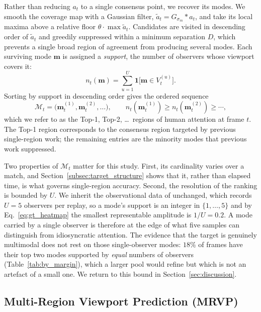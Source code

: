 \documentclass[preprint,12pt]{elsarticle}
\begin{document}
Rather than reducing $a_t$ to a single consensus point, we recover its modes.
We smooth the coverage map with a Gaussian filter, $\tilde{a}_t = G_{\sigma_m}
* a_t$, and take its local maxima above a relative floor
$\theta \cdot \max \tilde{a}_t$. Candidates are visited in descending order of
$\tilde{a}_t$ and greedily suppressed within a minimum separation $D$, which
prevents a single broad region of agreement from producing several modes. Each
surviving mode $\mathbf{m}$ is assigned a \emph{support}, the number of
observers whose viewport covers it:
\begin{equation}
  n_t(\mathbf{m}) = \sum_{u=1}^{U} \mathbf{1}\bigl[\mathbf{m} \in V^{(u)}_t\bigr].
  \label{eq:support}
\end{equation}
Sorting by support in descending order gives the ordered sequence
\begin{equation}
  \mathcal{M}_t = \bigl(\mathbf{m}^{(1)}_t, \mathbf{m}^{(2)}_t, \ldots\bigr),
  \qquad n_t(\mathbf{m}^{(1)}_t) \ge n_t(\mathbf{m}^{(2)}_t) \ge \cdots,
  \label{eq:ranked_modes}
\end{equation}
which we refer to as the Top-1, Top-2, \ldots\ regions of human attention at
frame $t$. The Top-1 region corresponds to the consensus region targeted by
previous single-region work; the remaining entries are the minority modes that
previous work suppressed.

Two properties of $\mathcal{M}_t$ matter for this study. First, its cardinality
varies over a match, and Section~\ref{subsec:target_structure} shows that it,
rather than elapsed time, is what governs single-region accuracy. Second, the
resolution of the ranking is bounded by $U$. We inherit the observational data
of \cite{joo2023learning} unchanged, which records $U=5$ observers per replay,
so a mode's support is an integer in $\{1,\ldots,5\}$ and by
Eq.~\ref{eq:gt_heatmap} the smallest representable amplitude is $1/U = 0.2$.
A mode carried by a single observer is therefore at the edge of what five
samples can distinguish from idiosyncratic attention. The evidence that the
target is genuinely multimodal does not rest on those single-observer modes:
$18\%$ of frames have their top two modes supported by \emph{equal} numbers of
observers (Table~\ref{tab:by_margin}), which a larger pool would refine but
which is not an artefact of a small one. We return to this bound in
Section~\ref{sec:discussion}.

\subsection{Multi-Region Viewport Prediction (MRVP)}
\end{document}
